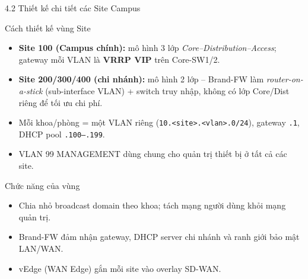 \begin{frame}{4.2 Thiết kế chi tiết các Site Campus}
    \small
    \begin{block}{Cách thiết kế vùng Site}
        \begin{itemize}
            \item \textbf{Site 100 (Campus chính):} mô hình 3 lớp
                  \emph{Core--Distribution--Access}; gateway mỗi VLAN là
                  \textbf{VRRP VIP} trên Core-SW1/2.
            \item \textbf{Site 200/300/400 (chi nhánh):} mô hình 2 lớp --
                  Brand-FW làm \emph{router-on-a-stick} (sub-interface
                  VLAN) + switch truy nhập, không có lớp Core/Dist riêng
                  để tối ưu chi phí.
            \item Mỗi khoa/phòng = một VLAN riêng
                  (\texttt{10.<site>.<vlan>.0/24}), gateway \texttt{.1},
                  DHCP pool \texttt{.100--.199}.
            \item VLAN 99 MANAGEMENT dùng chung cho quản trị thiết bị ở
                  tất cả các site.
        \end{itemize}
    \end{block}
    \vspace{0.12cm}
    \begin{block}{Chức năng của vùng}
        \begin{itemize}
            \item Chia nhỏ broadcast domain theo khoa; tách mạng người
                  dùng khỏi mạng quản trị.
            \item Brand-FW đảm nhận gateway, DHCP server chi nhánh và
                  ranh giới bảo mật LAN/WAN.
            \item vEdge (WAN Edge) gắn mỗi site vào overlay SD-WAN.
        \end{itemize}
    \end{block}
\end{frame}

